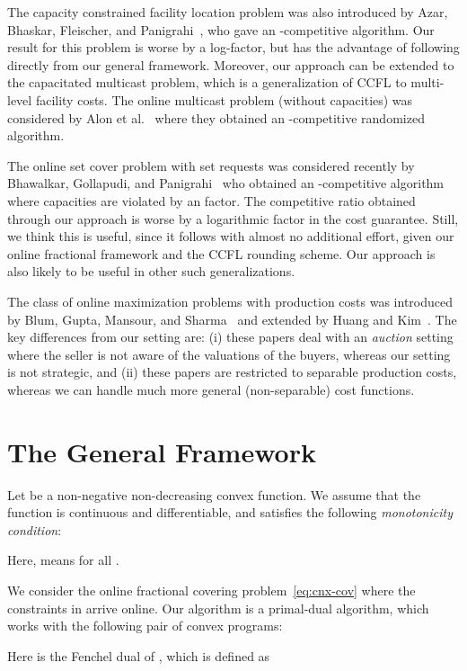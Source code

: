 \documentclass[letterpaper,11pt]{article}
\begin{document}
The capacity constrained facility location problem was also introduced
by Azar, Bhaskar, Fleischer, and Panigrahi~\cite{ABFP13}, who gave an
-competitive algorithm. Our result for this
problem is worse by a log-factor, but has the advantage of following
directly from our general framework. Moreover, our approach can be
extended to the capacitated multicast problem, which is a generalization
of CCFL to multi-level facility costs. The online multicast problem
(without capacities) was considered by Alon et al.~\cite{AAABN-talg06}
where they obtained an -competitive randomized
algorithm.

The online set cover problem with set requests was considered recently
by Bhawalkar, Gollapudi, and Panigrahi~\cite{BGP14} who obtained an
-competitive algorithm where capacities are violated
by an  factor. The competitive ratio obtained
through our approach is worse by a logarithmic factor in the cost
guarantee. Still, we think this is useful, since it follows with almost
no additional effort, given our online fractional framework and the CCFL
rounding scheme. Our approach is also likely to be useful in other such
generalizations.

The class of online maximization problems with production costs was
introduced by Blum, Gupta, Mansour, and Sharma~\cite{BGMS11} and
extended by Huang and Kim~\cite{HK15}. The key differences from our
setting are: (i) these papers deal with an {\em auction} setting where
the seller is not aware of the valuations of the buyers, whereas our
setting is not strategic, and (ii) these papers are restricted to
separable production costs, whereas we can handle much more general
(non-separable) cost functions.


\section{The General Framework}
\label{sec:general}

Let  be a non-negative non-decreasing convex
function. We assume that the function  is continuous and
differentiable, and satisfies the following \emph{monotonicity
  condition}:

 Here,  means  for all .

We consider the online fractional covering problem~\eqref{eq:cnx-cov}
where the constraints in  arrive online. Our algorithm is a
primal-dual algorithm, which works with the following pair of convex
programs:

Here  is the Fenchel dual of , which is defined
as
\end{document}
